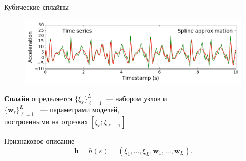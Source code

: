 \documentclass{beamer}
\begin{document}
\begin{frame}{Кубические сплайны}
	\begin{figure}[h]
		\centering
		\includegraphics[width=1\linewidth]{spline_example.png}
	\end{figure}
	\vfill
	\textbf{Сплайн} определяется $\{\xi_\ell\}_{\ell=1}^L$~--- набором узлов и\\ \hspace{3.85cm}$\{\mathbf{w}_\ell\}_{\ell=1}^L$ ~--- параметрами моделей, \\ \hspace{3.8cm} построенными на отрезках $[\xi_\ell; \xi_{\ell + 1}]$.
	\vfill
	\begin{block}{Признаковое описание}
		\[
		\bm{h} = h(s) = (\xi_1, \dots, \xi_L, \mathbf{w}_1, \dots, \mathbf{w}_L).
		\]
	\end{block}
\end{frame}
\end{document}
